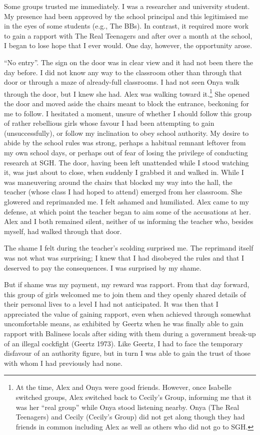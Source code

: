 Some groups trusted me immediately. I was a researcher and university student. My presence had been approved by the school principal and this legitimised me in the eyes of some students (e.g., The BBs). In contrast, it required more work to gain a rapport with The Real Teenagers and after over a month at the school, I began to lose hope that I ever would. One day, however, the opportunity arose.

``No entry''. The sign on the door was in clear view and it had not been there the day before. I did not know any way to the classroom other than through that door or through a maze of already-full classrooms. I had not seen Onya walk through the door, but I knew she had. Alex was walking toward it.\footnote{At the time, Alex and Onya were good friends. However, once Isabelle switched groups, Alex switched back to Cecily's Group, informing me that it was her ``real group'' while Onya stood listening nearby. Onya (The Real Teenagers) and Cecily (Cecily's Group) did not get along though they had friends in common including Alex as well as others who did not go to SGH.}  She opened the door and moved aside the chairs meant to block the entrance, beckoning for me to follow. I hesitated a moment, unsure of whether I should follow this group of rather rebellious girls whose favour I had been attempting to gain (unsuccessfully), or follow my inclination to obey school authority. My desire to abide by the school rules was strong, perhaps a habitual remnant leftover from my own school days, or perhaps out of fear of losing the privilege of conducting research at SGH. The door, having been left unattended while I stood watching it, was just about to close, when suddenly I grabbed it and walked in. While I was maneuvering around the chairs that blocked my way into the hall, the teacher (whose class I had hoped to attend) emerged from her classroom. She glowered and reprimanded me. I felt ashamed and humiliated. Alex came to my defense, at which point the teacher began to aim some of the accusations at her. Alex and I both remained silent, neither of us informing the teacher who, besides myself, had walked through that door.

The shame I felt during the teacher's scolding surprised me. The reprimand itself was not what was surprising; I knew that I had disobeyed the rules and that I deserved to pay the consequences. I was surprised by my shame. 

But if shame was my payment, my reward was rapport. From that day forward, this group of girls welcomed me to join them and they openly shared details of their personal lives to a level I had not anticipated. It was then that I appreciated the value of gaining rapport, even when achieved through somewhat uncomfortable means, as exhibited by Geertz when he was finally able to gain rapport with Balinese locals after siding with them during a government break-up of an illegal cockfight (Geertz 1973). Like Geertz, I had to face the temporary disfavour of an authority figure, but in turn I was able to gain the trust of those with whom I had previously had none. 

